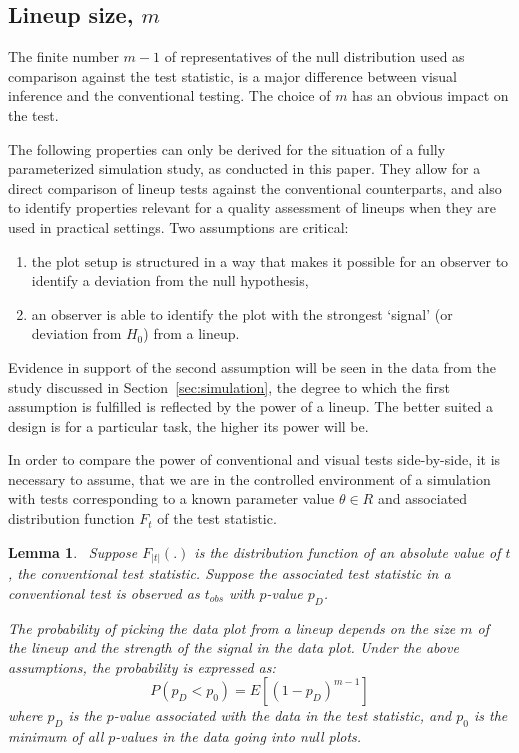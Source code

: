 \documentclass[12pt]{article}
\newcommand{\red}[1]{{\color{red} #1}}
\newtheorem{lemma}[thm]{Lemma}
\begin{document}

\subsection{Lineup size, $m$}

The finite number $m-1$ of representatives of the null distribution used  as comparison against the test statistic, is a major difference between visual inference and the conventional testing. The choice of $m$ has an obvious impact on the test.

The following properties can only be derived for the situation of a fully parameterized  simulation study, as conducted in this paper. They allow for a direct comparison of lineup tests against the conventional counterparts, and also to identify properties relevant for a quality assessment of lineups when they are used in practical settings. Two assumptions are critical:
\begin{enumerate} \itemsep 0in
\item  the plot setup is structured in a way that makes it possible for an observer to identify a deviation from the null hypothesis,
\item an observer is able to identify the plot with the strongest `signal' (or deviation from $H_0$)  from a lineup.
\end{enumerate}
Evidence in support of the second assumption will be seen in the data from the study discussed in Section~\ref{sec:simulation}, the degree to which the first assumption is fulfilled is reflected by the power of a lineup. The better suited a design is for a particular task, the higher its power will be.

In order to compare the power of conventional and visual tests side-by-side, it is necessary to assume, that we are in the controlled environment of a simulation with tests corresponding to a known parameter value $\theta \in R$ and associated distribution function $F_t$ of the test statistic. 

\begin{lemma}~\label{lemma}
Suppose $F_{|t|}(.)$ is the distribution function of an absolute value of $t$, the conventional test statistic. Suppose the associated test statistic in a conventional test is observed as  $t_{obs}$ with $p$-value $p_D$. 

The probability of picking the data plot from a lineup depends on the size $m$ of the lineup and the strength of the signal in the data plot. 
Under the above assumptions, the probability is expressed as:
\[
P(p_D < p_0) =  E\left[ (1 - p_D)^{m-1}\right]
\]
where $p_D$ is the $p$-value associated with the data in the test statistic, and $p_0$ is the minimum of all $p$-values in the data going into null plots.
\end{lemma}
\end{document}
